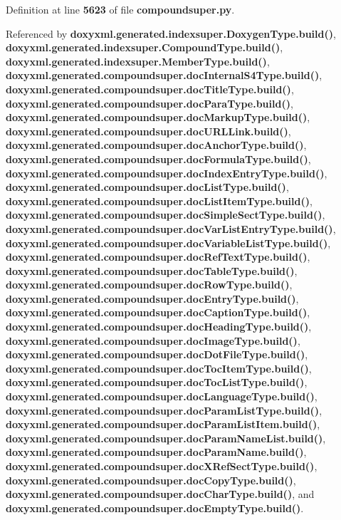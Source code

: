 Definition at line {\bf 5623} of file {\bf compoundsuper.\+py}.



Referenced by {\bf doxyxml.\+generated.\+indexsuper.\+Doxygen\+Type.\+build()}, {\bf doxyxml.\+generated.\+indexsuper.\+Compound\+Type.\+build()}, {\bf doxyxml.\+generated.\+indexsuper.\+Member\+Type.\+build()}, {\bf doxyxml.\+generated.\+compoundsuper.\+doc\+Internal\+S4\+Type.\+build()}, {\bf doxyxml.\+generated.\+compoundsuper.\+doc\+Title\+Type.\+build()}, {\bf doxyxml.\+generated.\+compoundsuper.\+doc\+Para\+Type.\+build()}, {\bf doxyxml.\+generated.\+compoundsuper.\+doc\+Markup\+Type.\+build()}, {\bf doxyxml.\+generated.\+compoundsuper.\+doc\+U\+R\+L\+Link.\+build()}, {\bf doxyxml.\+generated.\+compoundsuper.\+doc\+Anchor\+Type.\+build()}, {\bf doxyxml.\+generated.\+compoundsuper.\+doc\+Formula\+Type.\+build()}, {\bf doxyxml.\+generated.\+compoundsuper.\+doc\+Index\+Entry\+Type.\+build()}, {\bf doxyxml.\+generated.\+compoundsuper.\+doc\+List\+Type.\+build()}, {\bf doxyxml.\+generated.\+compoundsuper.\+doc\+List\+Item\+Type.\+build()}, {\bf doxyxml.\+generated.\+compoundsuper.\+doc\+Simple\+Sect\+Type.\+build()}, {\bf doxyxml.\+generated.\+compoundsuper.\+doc\+Var\+List\+Entry\+Type.\+build()}, {\bf doxyxml.\+generated.\+compoundsuper.\+doc\+Variable\+List\+Type.\+build()}, {\bf doxyxml.\+generated.\+compoundsuper.\+doc\+Ref\+Text\+Type.\+build()}, {\bf doxyxml.\+generated.\+compoundsuper.\+doc\+Table\+Type.\+build()}, {\bf doxyxml.\+generated.\+compoundsuper.\+doc\+Row\+Type.\+build()}, {\bf doxyxml.\+generated.\+compoundsuper.\+doc\+Entry\+Type.\+build()}, {\bf doxyxml.\+generated.\+compoundsuper.\+doc\+Caption\+Type.\+build()}, {\bf doxyxml.\+generated.\+compoundsuper.\+doc\+Heading\+Type.\+build()}, {\bf doxyxml.\+generated.\+compoundsuper.\+doc\+Image\+Type.\+build()}, {\bf doxyxml.\+generated.\+compoundsuper.\+doc\+Dot\+File\+Type.\+build()}, {\bf doxyxml.\+generated.\+compoundsuper.\+doc\+Toc\+Item\+Type.\+build()}, {\bf doxyxml.\+generated.\+compoundsuper.\+doc\+Toc\+List\+Type.\+build()}, {\bf doxyxml.\+generated.\+compoundsuper.\+doc\+Language\+Type.\+build()}, {\bf doxyxml.\+generated.\+compoundsuper.\+doc\+Param\+List\+Type.\+build()}, {\bf doxyxml.\+generated.\+compoundsuper.\+doc\+Param\+List\+Item.\+build()}, {\bf doxyxml.\+generated.\+compoundsuper.\+doc\+Param\+Name\+List.\+build()}, {\bf doxyxml.\+generated.\+compoundsuper.\+doc\+Param\+Name.\+build()}, {\bf doxyxml.\+generated.\+compoundsuper.\+doc\+X\+Ref\+Sect\+Type.\+build()}, {\bf doxyxml.\+generated.\+compoundsuper.\+doc\+Copy\+Type.\+build()}, {\bf doxyxml.\+generated.\+compoundsuper.\+doc\+Char\+Type.\+build()}, and {\bf doxyxml.\+generated.\+compoundsuper.\+doc\+Empty\+Type.\+build()}.



